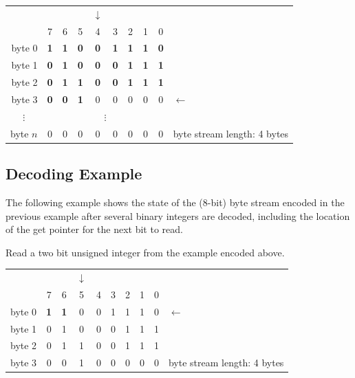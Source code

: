 \documentclass[11pt,letterpaper]{book}
\numberwithin{equation}{chapter}
\numberwithin{figure}{chapter}
\numberwithin{table}{chapter}
\begin{document}
\begin{tabular}{r|ccccccccl}
\multicolumn{1}{r}{} &&&&$\downarrow$&&&&& \\
         & 7 & 6 & 5 & 4 & 3 & 2 & 1 & 0 &            \\\cline{1-9}
byte 0   & \textbf{1} & \textbf{1} & \textbf{0} & \textbf{0} &
           \textbf{1} & \textbf{1} & \textbf{1} & \textbf{0} & \\
byte 1   & \textbf{0} & \textbf{1} & \textbf{0} & \textbf{0} &
           \textbf{0} & \textbf{1} & \textbf{1} & \textbf{1} & \\
byte 2   & \textbf{0} & \textbf{1} & \textbf{1} & \textbf{0} &
           \textbf{0} & \textbf{1} & \textbf{1} & \textbf{1} & \\
byte 3   & \textbf{0} & \textbf{0} & \textbf{1} &
                       0 & 0 & 0 & 0 & 0 & $\leftarrow$        \\
\multicolumn{1}{c|}{$\vdots$}&\multicolumn{8}{c}{$\vdots$}&    \\
byte $n$ & 0 & 0 & 0 & 0 & 0 & 0 & 0 & 0 &
byte stream length: 4 bytes
\end{tabular}
\vspace{\baselineskip}

\subsection{Decoding Example}

The following example shows the state of the (8-bit) byte stream encoded in the
 previous example after several binary integers are decoded, including the
 location of the get pointer for the next bit to read.

Read a two bit unsigned integer from the example encoded above.

\begin{tabular}{r|ccccccccl}
\multicolumn{1}{r}{} &&&$\downarrow$&&&&&&              \\
         & 7 & 6 & 5 & 4 & 3 & 2 & 1 & 0 &              \\\cline{1-9}
byte 0   & \textbf{1} & \textbf{1} & 0 & 0 & 1 & 1 & 1 & 0 & $\leftarrow$ \\
byte 1   & 0 & 1 & 0 & 0 & 0 & 1 & 1 & 1 &              \\
byte 2   & 0 & 1 & 1 & 0 & 0 & 1 & 1 & 1 &              \\
byte 3   & 0 & 0 & 1 & 0 & 0 & 0 & 0 & 0 &
byte stream length: 4 bytes
\end{tabular}
\vspace{\baselineskip}
\end{document}
